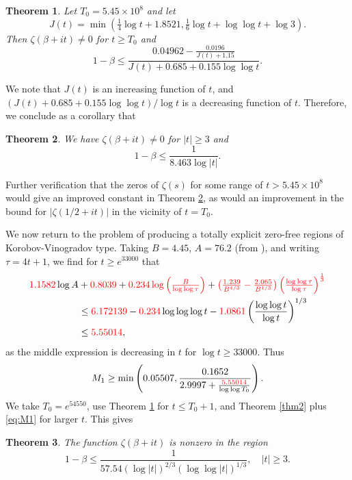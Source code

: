 \documentclass[10pt]{amsart}
\theoremstyle{remark}
\theoremstyle{plain}
\newtheorem{theorem}{Theorem}
\numberwithin{equation}{section}
\theoremstyle{definition}
\def\({\left(}
\def\){\right)}
\def\pfrac#1#2{\left(\frac{#1}{#2}\right)}
\newcommand{\be}{\begin{equation}}
\newcommand{\rev}[1]{{\color{red}#1}}
\begin{document}
\begin{theorem}\label{thm3}  Let $T_0=5.45\times 10^8$ and let
\be
J(t) = \min \( \tfrac14 \log t +1.8521, \tfrac16 \log t +\log\log t +\log 3 \).
\label{eq:J(t)}
\end{equation}
Then $\zeta(\beta+it)\ne 0$ for $t\ge T_0$ and 
\be
1-\beta \le \frac{0.04962-\frac{0.0196}{J(t)+1.15}}
{J(t)+0.685+0.155\log\log t}.
\label{eq:clas 1}
\end{equation}
\end{theorem}

We note that $J(t)$ is an increasing function of $t$, and
$(J(t)+0.685+0.155\log\log t)/\log t$ is a decreasing function of $t$.
Therefore, we conclude as a corollary that

\begin{theorem}\label{thm4}
We have $\zeta(\beta+it) \ne 0$ for $|t|\ge 3$ and
$$
1-\beta \le \frac{1}{8.463 \log |t|}.
$$
\end{theorem}

Further verification that the zeros of $\zeta(s)$ for some range of
$t>5.45\times 10^8$ would give an improved constant in Theorem \ref{thm4},
as would an improvement in the bound for $|\zeta(1/2+it)|$ in
the vicinity of $t=T_0$.

We now return to the problem of producing a totally explicit
 zero-free regions of Korobov-Vinogradov type.
Taking $B=4.45$, $A=76.2$ (from \cite{F}), \rev{and writing $\tau=4t+1$}, we find
\rev{for $t\ge e^{33000}$ that}
\begin{align*}
\rev{1.1582}\log A&+\rev{0.8039}+\rev{0.234\log \(\tfrac{B}{\log\log \tau}\)} +
\rev{\( \tfrac{1.239}{B^{4/3}}-\tfrac{2.065}{B^{1/3}} \)
 \( \tfrac{\log\log \tau }{\log  \tau} \)^{\frac13}} \\
&\le \rev{6.172139}-\rev{0.234}\log\log\log t - \rev{1.0861}\pfrac{\log\log t}
  {\log t}^{1/3} \\
&\le \rev{5.55014},
\end{align*}
\rev{as the middle expression is decreasing in $t$ for $\log t \ge 33000$.}
Thus
\be
M_1 \ge \min \( 0.05507, \frac{0.1652}
{2.9997 +\frac{\rev{5.55014}}{\log\log T_0}} \). \label{eq:M1}
\end{equation}
We take $T_0=e^{54550}$, use Theorem \ref{thm3}
for $t \le T_0+1$, and Theorem
\ref{thm2} plus \eqref{eq:M1} for larger $t$.  This gives

\begin{theorem}\label{thm5}
The function $\zeta(\beta+it)$ is nonzero in the
region
$$
1-\beta \le \frac{1}{57.54(\log |t|)^{2/3} (\log\log |t|)^{1/3}},
 \quad |t|\ge 3.
$$
\end{theorem}
\end{document}

